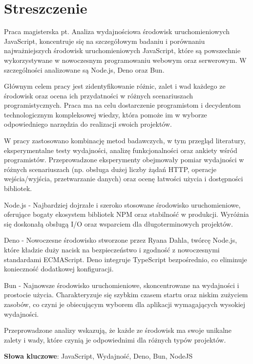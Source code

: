 \section*{Streszczenie}
Praca magisterska pt. Analiza wydajnościowa środowisk uruchomieniowych JavaScript, koncentruje się na szczegółowym badaniu i porównaniu najważniejszych środowisk uruchomieniowych JavaScript, które są powszechnie wykorzystywane w nowoczesnym programowaniu webowym oraz serwerowym. W szczególności analizowane są Node.js, Deno oraz Bun.

Głównym celem pracy jest zidentyfikowanie różnic, zalet i wad każdego ze środowisk oraz ocena ich przydatności w różnych scenariuszach programistycznych. Praca ma na celu dostarczenie programistom i decydentom technologicznym kompleksowej wiedzy, która pomoże im w wyborze odpowiedniego narzędzia do realizacji swoich projektów.

W pracy zastosowano kombinację metod badawczych, w tym przegląd literatury, eksperymentalne testy wydajności, analizę funkcjonalności oraz ankiety wśród programistów. Przeprowadzone eksperymenty obejmowały pomiar wydajności w różnych scenariuszach (np. obsługa dużej liczby żądań HTTP, operacje wejścia/wyjścia, przetwarzanie danych) oraz ocenę łatwości użycia i dostępności bibliotek.

Node.js - Najbardziej dojrzałe i szeroko stosowane środowisko uruchomieniowe, oferujące bogaty ekosystem bibliotek NPM oraz stabilność w produkcji. Wyróżnia się doskonałą obsługą I/O oraz wsparciem dla długoterminowych projektów.

Deno - Nowoczesne środowisko stworzone przez Ryana Dahla, twórcę Node.js, które kładzie duży nacisk na bezpieczeństwo i zgodność z nowoczesnymi standardami ECMAScript. Deno integruje TypeScript bezpośrednio, co eliminuje konieczność dodatkowej konfiguracji.

Bun - Najnowsze środowisko uruchomieniowe, skoncentrowane na wydajności i prostocie użycia. Charakteryzuje się szybkim czasem startu oraz niskim zużyciem zasobów, co czyni je obiecującym wyborem dla aplikacji wymagających wysokiej wydajności.

Przeprowadzone analizy wskazują, że każde ze środowisk ma swoje unikalne zalety i wady, które czynią je odpowiednimi dla różnych typów projektów.

\bigskip

\textbf{Słowa kluczowe}: JavaScript, Wydajność, Deno, Bun, NodeJS
\newpage

